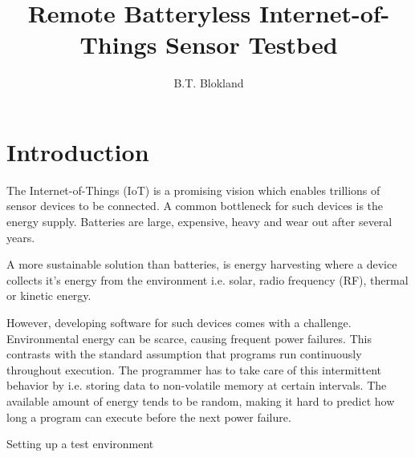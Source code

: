 \documentclass[]{article}
\title{Remote Batteryless Internet-of-Things Sensor Testbed}
\author{B.T. Blokland}
\begin{document}
\maketitle

\section{Introduction}

The Internet-of-Things (IoT) is a promising vision which enables trillions of sensor devices to be connected. A common bottleneck for such devices is the energy supply. Batteries are large, expensive, heavy and wear out after several years.

A more sustainable solution than batteries, is energy harvesting where a device collects it's energy from the environment i.e. solar, radio frequency (RF), thermal or kinetic energy.

However, developing software for such devices comes with a challenge. Environmental energy can be scarce, causing frequent power failures. This contrasts with the standard assumption that programs run continuously throughout execution. The programmer has to take care of this intermittent behavior by i.e. storing data to non-volatile memory at certain intervals. The available amount of energy tends to be random, making it hard to predict how long a program can execute before the next power failure.

Setting up a test environment 
\end{document}
